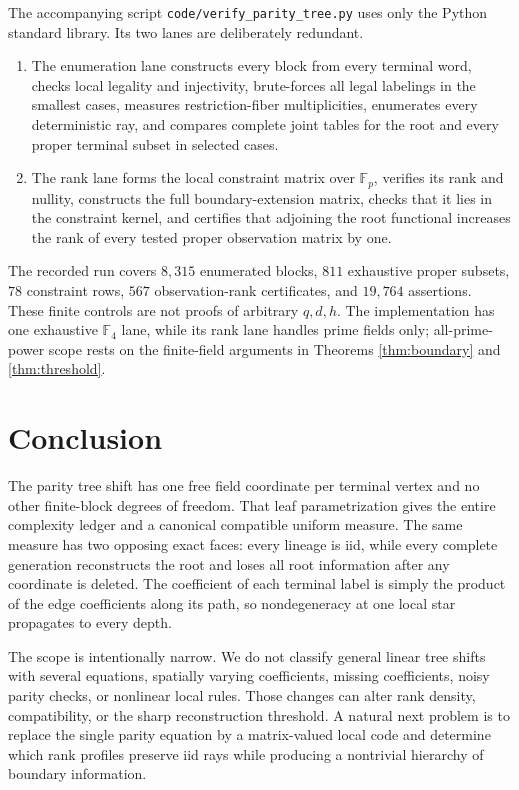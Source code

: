 \documentclass[11pt,a4paper]{amsart}
\theoremstyle{definition}
\theoremstyle{remark}
\newcommand{\F}{\mathbb F}
\begin{document}
The accompanying script \texttt{code/verify\_parity\_tree.py} uses only the
Python standard library.  Its two lanes are deliberately redundant.
\begin{enumerate}
\item The enumeration lane constructs every block from every terminal word,
checks local legality and injectivity, brute-forces all legal labelings in
the smallest cases, measures restriction-fiber multiplicities, enumerates
every deterministic ray, and compares complete joint tables for the root
and every proper terminal subset in selected cases.
\item The rank lane forms the local constraint matrix over $\F_p$, verifies
its rank and nullity, constructs the full boundary-extension matrix, checks
that it lies in the constraint kernel, and certifies that adjoining the root
functional increases the rank of every tested proper observation matrix by
one.
\end{enumerate}
The recorded run covers $8{,}315$ enumerated blocks, $811$ exhaustive proper
subsets, $78$ constraint rows, $567$ observation-rank certificates, and
$19{,}764$ assertions.  These finite controls are not proofs of arbitrary
$q,d,h$.  The implementation has one exhaustive $\F_4$ lane, while its rank
lane handles prime fields only; all-prime-power scope rests on the
finite-field arguments in Theorems \ref{thm:boundary} and
\ref{thm:threshold}.

\section{Conclusion}

The parity tree shift has one free field coordinate per terminal vertex and
no other finite-block degrees of freedom.  That leaf parametrization gives
the entire complexity ledger and a canonical compatible uniform measure.
The same measure has two opposing exact faces: every lineage is iid, while
every complete generation reconstructs the root and loses all root
information after any coordinate is deleted.  The coefficient of each
terminal label is simply the product of the edge coefficients along its
path, so nondegeneracy at one local star propagates to every depth.

The scope is intentionally narrow.  We do not classify general linear tree
shifts with several equations, spatially varying coefficients, missing
coefficients, noisy parity checks, or nonlinear local rules.  Those changes
can alter rank density, compatibility, or the sharp reconstruction
threshold.  A natural next problem is to replace the single parity equation
by a matrix-valued local code and determine which rank profiles preserve iid
rays while producing a nontrivial hierarchy of boundary information.


\renewcommand{\bibfont}{\small}

\end{document}
